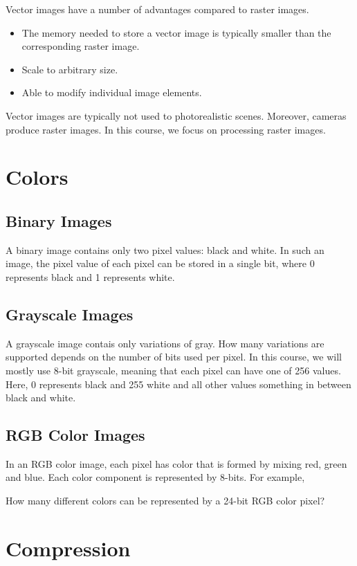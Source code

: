 \documentclass{book}
\begin{document}
Vector images have a number of advantages compared to raster images. 
\begin{itemize}
  \item The memory needed to store a vector image is typically smaller than the corresponding raster image.
  \item Scale to arbitrary size.
  \item Able to modify individual image elements.
\end{itemize}

Vector images are typically not used to photorealistic scenes. Moreover, cameras produce raster images. In this course, we focus on processing raster images.

\section{Colors}

\subsection{Binary Images}
A binary image contains only two pixel values: black and white. In such an image, the pixel value of each pixel can be stored in a single bit, where 0 represents black and 1 represents white. 

\subsection{Grayscale Images}
A grayscale image contais only variations of gray. How many variations are supported depends on the number of bits used per pixel. In this course, we will mostly use 8-bit grayscale, meaning that each pixel can have one of 256 values. Here, 0 represents black and 255 white and all other values something in between black and white.

\subsection{RGB Color Images}
In an RGB color image, each pixel has color that is formed by mixing red, green and blue. Each color component is represented by 8-bits. For example, 

\begin{exercise}
How many different colors can be represented by a 24-bit RGB color pixel?
\end{exercise}

\section{Compression}
 
\end{document}
